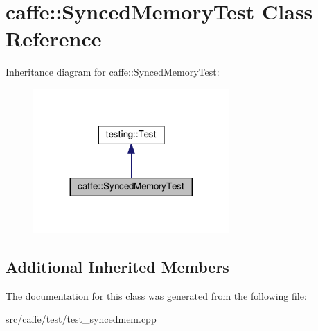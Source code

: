 \hypertarget{classcaffe_1_1_synced_memory_test}{}\section{caffe\+:\+:Synced\+Memory\+Test Class Reference}
\label{classcaffe_1_1_synced_memory_test}


Inheritance diagram for caffe\+:\+:Synced\+Memory\+Test\+:
\nopagebreak
\begin{figure}[H]
\begin{center}
\leavevmode
\includegraphics[width=212pt]{classcaffe_1_1_synced_memory_test__inherit__graph}
\end{center}
\end{figure}
\subsection*{Additional Inherited Members}


The documentation for this class was generated from the following file\+:\begin{DoxyCompactItemize}
\item 
src/caffe/test/test\+\_\+syncedmem.\+cpp\end{DoxyCompactItemize}
